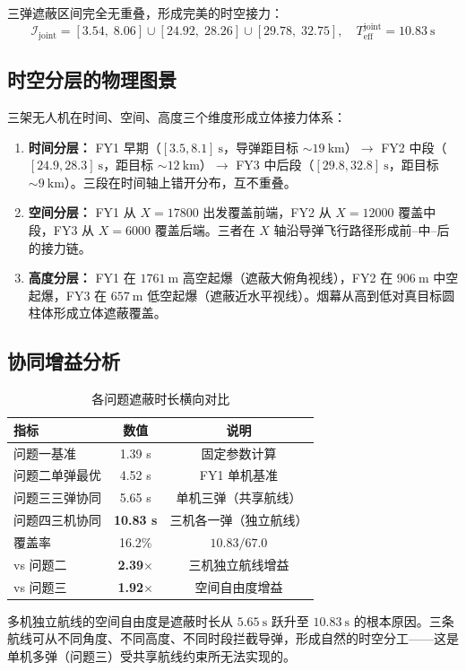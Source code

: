 \documentclass{ctexart}
\begin{document}
三弹遮蔽区间完全无重叠，形成完美的时空接力：
\[
\boxed{\mathcal{I}_{\text{joint}} = [3.54,\; 8.06] \cup [24.92,\; 28.26] \cup [29.78,\; 32.75],\quad T_{\text{eff}}^{\text{joint}} = 10.83\ \mathrm{s}}
\]

\subsection{时空分层的物理图景}

三架无人机在时间、空间、高度三个维度形成立体接力体系：

\begin{enumerate}
    \item \textbf{时间分层：} FY1 早期（$[3.5,8.1]\ \mathrm{s}$，导弹距目标 $\sim19\ \mathrm{km}$）$\to$ FY2 中段（$[24.9,28.3]\ \mathrm{s}$，距目标 $\sim12\ \mathrm{km}$）$\to$ FY3 中后段（$[29.8,32.8]\ \mathrm{s}$，距目标 $\sim9\ \mathrm{km}$）。三段在时间轴上错开分布，互不重叠。
    \item \textbf{空间分层：} FY1 从 $X=17800$ 出发覆盖前端，FY2 从 $X=12000$ 覆盖中段，FY3 从 $X=6000$ 覆盖后端。三者在 $X$ 轴沿导弹飞行路径形成前--中--后的接力链。
    \item \textbf{高度分层：} FY1 在 $1761\ \mathrm{m}$ 高空起爆（遮蔽大俯角视线），FY2 在 $906\ \mathrm{m}$ 中空起爆，FY3 在 $657\ \mathrm{m}$ 低空起爆（遮蔽近水平视线）。烟幕从高到低对真目标圆柱体形成立体遮蔽覆盖。
\end{enumerate}

\subsection{协同增益分析}

\begin{table}[H]
\centering
\caption{各问题遮蔽时长横向对比}
\label{tab:comparison}
\begin{tabular}{lcc}
\toprule
\textbf{指标} & \textbf{数值} & \textbf{说明} \\
\midrule
问题一基准       & 1.39 s  & 固定参数计算 \\
问题二单弹最优   & 4.52 s  & FY1 单机基准 \\
问题三三弹协同   & 5.65 s  & 单机三弹（共享航线）\\
问题四三机协同   & \textbf{10.83 s} & 三机各一弹（独立航线）\\
覆盖率           & 16.2\%  & $10.83/67.0$ \\
vs 问题二        & \textbf{2.39}$\times$ & 三机独立航线增益 \\
vs 问题三        & \textbf{1.92}$\times$ & 空间自由度增益 \\
\bottomrule
\end{tabular}
\end{table}

多机独立航线的空间自由度是遮蔽时长从 $5.65\ \mathrm{s}$ 跃升至 $10.83\ \mathrm{s}$ 的根本原因。三条航线可从不同角度、不同高度、不同时段拦截导弹，形成自然的时空分工——这是单机多弹（问题三）受共享航线约束所无法实现的。
\end{document}
